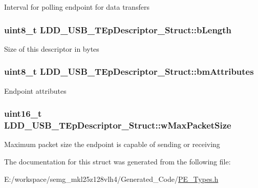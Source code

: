 Interval for polling endpoint for data transfers \hypertarget{struct_l_d_d___u_s_b___t_ep_descriptor___struct_ad4cc2b6088c7fb913f40eada94098393}{
\subsubsection[{b\-Length}]{\setlength{\rightskip}{0pt plus 5cm}uint8\-\_\-t L\-D\-D\-\_\-\-U\-S\-B\-\_\-\-T\-Ep\-Descriptor\-\_\-\-Struct\-::b\-Length}}\label{struct_l_d_d___u_s_b___t_ep_descriptor___struct_ad4cc2b6088c7fb913f40eada94098393}
Size of this descriptor in bytes \hypertarget{struct_l_d_d___u_s_b___t_ep_descriptor___struct_a7a3e6205355d7fa84899f23ac8e58490}{
\subsubsection[{bm\-Attributes}]{\setlength{\rightskip}{0pt plus 5cm}uint8\-\_\-t L\-D\-D\-\_\-\-U\-S\-B\-\_\-\-T\-Ep\-Descriptor\-\_\-\-Struct\-::bm\-Attributes}}\label{struct_l_d_d___u_s_b___t_ep_descriptor___struct_a7a3e6205355d7fa84899f23ac8e58490}
Endpoint attributes \hypertarget{struct_l_d_d___u_s_b___t_ep_descriptor___struct_a19e3e6b0524f2fcd25377f008c94c3c6}{
\subsubsection[{w\-Max\-Packet\-Size}]{\setlength{\rightskip}{0pt plus 5cm}uint16\-\_\-t L\-D\-D\-\_\-\-U\-S\-B\-\_\-\-T\-Ep\-Descriptor\-\_\-\-Struct\-::w\-Max\-Packet\-Size}}\label{struct_l_d_d___u_s_b___t_ep_descriptor___struct_a19e3e6b0524f2fcd25377f008c94c3c6}
Maximum packet size the endpoint is capable of sending or receiving 

The documentation for this struct was generated from the following file\-:\begin{DoxyCompactItemize}
\item 
E\-:/workspace/semg\-\_\-mkl25z128vlh4/\-Generated\-\_\-\-Code/\hyperlink{_p_e___types_8h}{P\-E\-\_\-\-Types.\-h}\end{DoxyCompactItemize}
